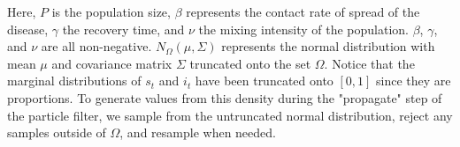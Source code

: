 \documentclass[useAMS,referee,usenatbib]{biom}
\begin{document}


%

\noindent Here, $P$ is the population size, $\beta$ represents the contact rate of spread of the disease, $\gamma$ the recovery time, and $\nu$ the mixing intensity of the population.  $\beta$, $\gamma$, and $\nu$ are all non-negative. $N_{\Omega}(\mu,\Sigma)$ represents the normal distribution with mean $\mu$ and covariance matrix $\Sigma$ truncated onto the set $\Omega$.  Notice that the marginal distributions of $s_t$ and $i_t$ have been truncated onto $[0,1]$ since they are proportions.  To generate values from this density during the "propagate" step of the particle filter, we sample from the untruncated normal distribution, reject any samples outside of $\Omega$, and resample when needed.%
\end{document}
